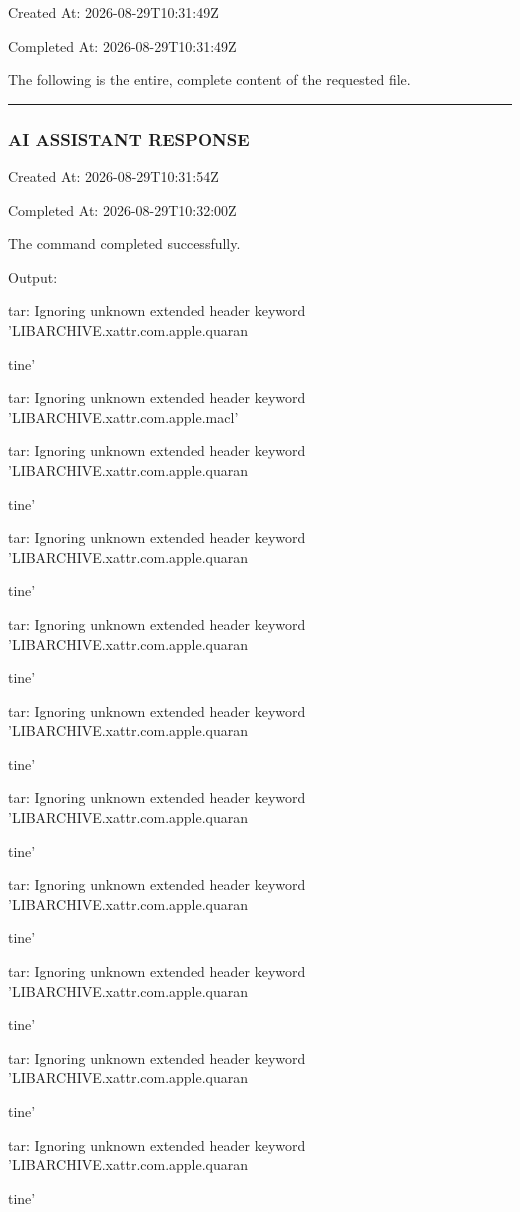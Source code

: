 \documentclass[11pt,a4paper]{article}
\begin{document}
Created At: 2026-08-29T10:31:49Z

Completed At: 2026-08-29T10:31:49Z

The following is the entire, complete content of the requested file.


\hrule

\subsubsection{AI ASSISTANT RESPONSE}

Created At: 2026-08-29T10:31:54Z

Completed At: 2026-08-29T10:32:00Z


The command completed successfully.

Output:

tar: Ignoring unknown extended header keyword 'LIBARCHIVE.xattr.com.apple.quaran

tine'

tar: Ignoring unknown extended header keyword 'LIBARCHIVE.xattr.com.apple.macl'

tar: Ignoring unknown extended header keyword 'LIBARCHIVE.xattr.com.apple.quaran

tine'

tar: Ignoring unknown extended header keyword 'LIBARCHIVE.xattr.com.apple.quaran

tine'

tar: Ignoring unknown extended header keyword 'LIBARCHIVE.xattr.com.apple.quaran

tine'

tar: Ignoring unknown extended header keyword 'LIBARCHIVE.xattr.com.apple.quaran

tine'

tar: Ignoring unknown extended header keyword 'LIBARCHIVE.xattr.com.apple.quaran

tine'

tar: Ignoring unknown extended header keyword 'LIBARCHIVE.xattr.com.apple.quaran

tine'

tar: Ignoring unknown extended header keyword 'LIBARCHIVE.xattr.com.apple.quaran

tine'

tar: Ignoring unknown extended header keyword 'LIBARCHIVE.xattr.com.apple.quaran

tine'

tar: Ignoring unknown extended header keyword 'LIBARCHIVE.xattr.com.apple.quaran

tine'
\end{document}
